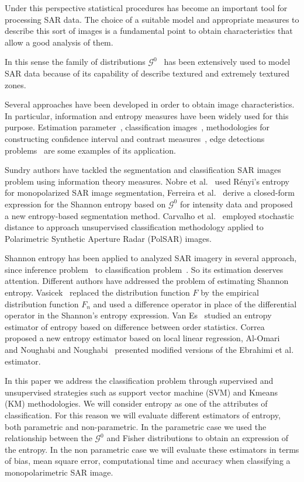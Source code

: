 \documentclass[journal]{IEEEtran}
\begin{document}
Under this perspective statistical procedures has become an important tool for processing SAR data. The choice of a suitable model and appropriate measures to describe this sort of images is a fundamental point to obtain characteristics that allow a good analysis of them.

In this sense the family of distributions $\mathcal{G}^0$~\cite{Frery97} has been extensively used to model SAR data because of its capability of describe textured and extremely textured zones. 

Several approaches have been developed in order to obtain image characteristics. In particular, information and entropy measures have been widely used for this purpose. Estimation parameter~\cite{gambini2015}, classification images~\cite{Carvalho2019}, methodologies for constructing
confidence interval and contrast measures~\cite{Frery2012,Nascimento2009}, edge detections problems~\cite{Nascimento2014} are some examples of its application.

Sundry authors have tackled the segmentation and classification SAR images problem using information theory measures. Nobre et al.~\cite{Nobre2016} used Rényi's entropy for monopolarized SAR image segmentation, Ferreira et al.~\cite{Ferreira2020} derive a closed-form expression for the Shannon entropy based on $\mathcal{G}^0$ for intensity data and proposed a new entropy-based segmentation method. Carvalho et al.~\cite{Carvalho2019} employed stochastic distance to approach unsupervised classification methodology applied to Polarimetric Synthetic Aperture Radar (PolSAR) images.

Shannon entropy has been applied to analyzed SAR imagery in several approach, since inference problem~\cite{Frery2012} to classification problem~\cite{Ferreira2020}. So its estimation deserves attention. Different authors have addressed the problem of estimating Shannon entropy. Vasicek~\cite{Vasicek76} replaced the distribution function $F$ by the empirical distribution function $F_n$ and used a difference operator in place of the differential operator in the Shannon's entropy expression. Van Es~\cite{VanEs92} studied an entropy estimator of entropy based on difference between order statistics. Correa~\cite{Correa95} proposed a new entropy estimator based on local linear regression,  Al-Omari~\cite{AlOmari2013} and Noughabi and Noughabi~\cite{Noughabi13} presented modified versions of the Ebrahimi et al.~\cite{Ebrahimi94} estimator.

In this paper we address the classification problem through supervised and unsupervised strategies such as support vector machine (SVM) and Kmeans (KM) methodologies. We will consider entropy as one of the attributes of classification. For this reason we will evaluate different estimators of entropy, both parametric and non-parametric. In the parametric case we used the relationship between the $\mathcal{G}^0$ and Fisher distributions to obtain an expression of the entropy. In the non parametric case we will evaluate these estimators in terms of bias, mean square error, computational time and accuracy when classifying a monopolarimetric SAR image. 
\end{document}
